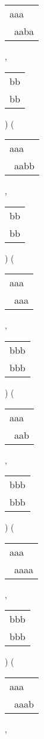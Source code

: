 \begin{description}
\begin{tabular}{|l|} \hline
aaa\ \  \\
\ aaba \\
\hline
\end{tabular} 
 , 
\begin{tabular}{|l|} \hline
bb \\
bb \\
\hline
\end{tabular} 
) 
 ( 
\begin{tabular}{|l|} \hline
aaa\ \  \\
\ aabb \\
\hline
\end{tabular} 
 , 
\begin{tabular}{|l|} \hline
bb \\
bb \\
\hline
\end{tabular} 
) 
 ( 
\begin{tabular}{|l|} \hline
aaa\  \\
\ aaa \\
\hline
\end{tabular} 
 , 
\begin{tabular}{|l|} \hline
bbb \\
bbb \\
\hline
\end{tabular} 
) 
 ( 
\begin{tabular}{|l|} \hline
aaa\  \\
\ aab \\
\hline
\end{tabular} 
 , 
\begin{tabular}{|l|} \hline
bbb \\
bbb \\
\hline
\end{tabular} 
) 
 ( 
\begin{tabular}{|l|} \hline
aaa\ \  \\
\ aaaa \\
\hline
\end{tabular} 
 , 
\begin{tabular}{|l|} \hline
bbb \\
bbb \\
\hline
\end{tabular} 
) 
 ( 
\begin{tabular}{|l|} \hline
aaa\ \  \\
\ aaab \\
\hline
\end{tabular} 
 , 
\begin{tabular}{|l|} \hline

\end{tabular}
\end{description}
